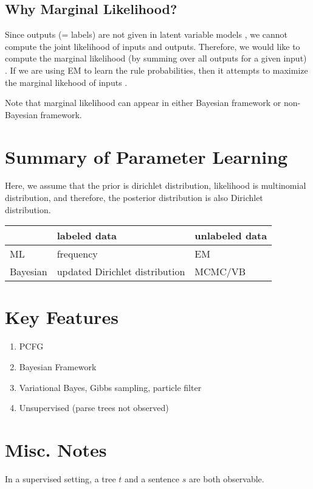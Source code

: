 \documentclass[11pt]{article}
\begin{document}
\subsection{Why Marginal Likelihood?}
Since outputs (= labels) are not given in latent variable models \cite{liang_jordan_klein}, we cannot compute the joint likelihood of inputs and outputs. Therefore, we would like to compute the marginal likelihood (by summing over all outputs for a given input) \cite{pcfg_marginal}. If we are using EM to learn the rule probabilities, then it attempts to maximize the marginal likehood of inputs \cite{pcfg_marginal}.

Note that marginal likelihood can appear in either Bayesian framework or non-Bayesian framework.

\section{Summary of Parameter Learning \cite{mlss09}}

Here, we assume that the prior is dirichlet distribution, likelihood is multinomial distribution, and therefore, the posterior distribution is also Dirichlet distribution.

\begin{center}
    \begin{tabular}{|l|l|l|}
    \hline
             & labeled data                    & unlabeled data  \\\hline
    ML       & frequency                       & EM              \\\hline
    Bayesian & updated Dirichlet distribution  & MCMC/VB         \\\hline
    \end{tabular}
\end{center}

\section{Key Features}
\begin{enumerate}
 \item PCFG
 \item Bayesian Framework
 \item Variational Bayes, Gibbs sampling, particle filter
 \item Unsupervised (parse trees not observed)
\end{enumerate}

\section{Misc. Notes}
In a supervised setting, a tree $t$ and a sentence $s$ are both observable.
\end{document}

